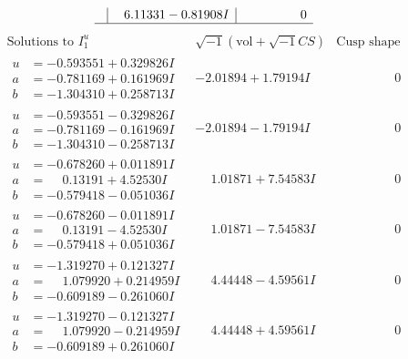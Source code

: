 \documentclass[1p]{elsarticle_modified}
\theoremstyle{definition}
\newcommand{\I}{\sqrt{-1}}
\begin{document}
$$\begin{array}{c|c|c}
 & \phantom{-}6.11331 - 0.81908 I & \phantom{-0.000000 } 0\\
 \hline 
 \end{array}$$\newpage$$\begin{array}{c|c|c}  
\text{Solutions to }I^u_{1}& \I (\text{vol} + \sqrt{-1}CS) & \text{Cusp shape}\\
 \hline 
\begin{aligned}
u &= -0.593551 + 0.329826 I \\
a &= -0.781169 + 0.161969 I \\
b &= -1.304310 + 0.258713 I\end{aligned}
 & -2.01894 + 1.79194 I & \phantom{-0.000000 } 0 \\ \hline\begin{aligned}
u &= -0.593551 - 0.329826 I \\
a &= -0.781169 - 0.161969 I \\
b &= -1.304310 - 0.258713 I\end{aligned}
 & -2.01894 - 1.79194 I & \phantom{-0.000000 } 0 \\ \hline\begin{aligned}
u &= -0.678260 + 0.011891 I \\
a &= \phantom{-}0.13191 + 4.52530 I \\
b &= -0.579418 - 0.051036 I\end{aligned}
 & \phantom{-}1.01871 + 7.54583 I & \phantom{-0.000000 } 0 \\ \hline\begin{aligned}
u &= -0.678260 - 0.011891 I \\
a &= \phantom{-}0.13191 - 4.52530 I \\
b &= -0.579418 + 0.051036 I\end{aligned}
 & \phantom{-}1.01871 - 7.54583 I & \phantom{-0.000000 } 0 \\ \hline\begin{aligned}
u &= -1.319270 + 0.121327 I \\
a &= \phantom{-}1.079920 + 0.214959 I \\
b &= -0.609189 - 0.261060 I\end{aligned}
 & \phantom{-}4.44448 - 4.59561 I & \phantom{-0.000000 } 0 \\ \hline\begin{aligned}
u &= -1.319270 - 0.121327 I \\
a &= \phantom{-}1.079920 - 0.214959 I \\
b &= -0.609189 + 0.261060 I\end{aligned}
 & \phantom{-}4.44448 + 4.59561 I & \phantom{-0.000000 } 0 \\ \hline\begin{aligned}

\end{aligned}
\end{array}$$
\end{document}
